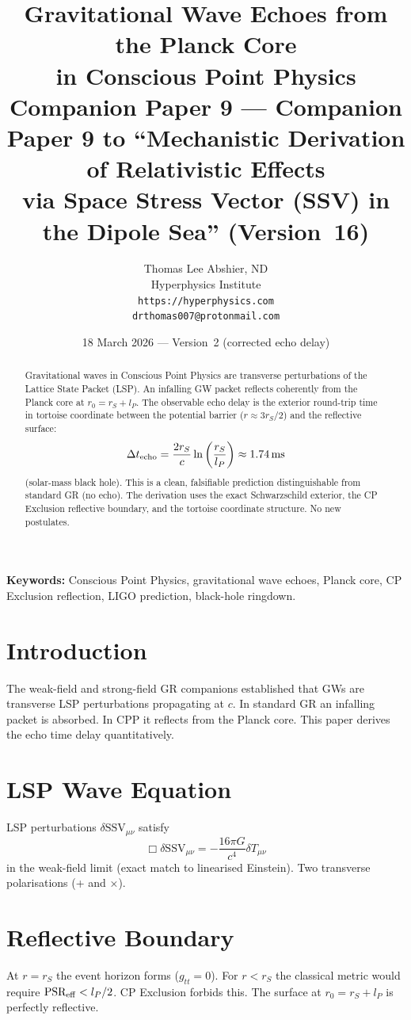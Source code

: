 \documentclass[12pt]{article}
\title{\textbf{Gravitational Wave Echoes from the Planck Core\\
in Conscious Point Physics}\\[6pt]
{\large Companion Paper 9 ---
Companion Paper 9 to ``Mechanistic Derivation of Relativistic Effects\\
via Space Stress Vector (SSV) in the Dipole Sea'' (Version~16)}}
\author{Thomas Lee Abshier, ND\\
Hyperphysics Institute\\
\texttt{https://hyperphysics.com}\\
\texttt{drthomas007@protonmail.com}}
\date{18 March 2026 --- Version~2 (corrected echo delay)}
\newcommand{\SSV}{\text{SSV}}
\begin{document}
\maketitle

\noindent\textbf{Keywords:} Conscious Point Physics, gravitational wave echoes, Planck core, CP Exclusion reflection, LIGO prediction, black-hole ringdown.

\begin{abstract}
Gravitational waves in Conscious Point Physics are transverse perturbations of the Lattice State Packet (LSP). An infalling GW packet reflects coherently from the Planck core at \(r_0 = r_S + l_P\). The observable echo delay is the exterior round-trip time in tortoise coordinate between the potential barrier (\(r \approx 3 r_S/2\)) and the reflective surface:
\[
\Delta t_{\rm echo} = \frac{2 r_S}{c} \ln\left(\frac{r_S}{l_P}\right) \approx 1.74\,\text{ms}
\]
(solar-mass black hole). This is a clean, falsifiable prediction distinguishable from standard GR (no echo). The derivation uses the exact Schwarzschild exterior, the CP Exclusion reflective boundary, and the tortoise coordinate structure. No new postulates.
\end{abstract}

\section{Introduction}
The weak-field and strong-field GR companions established that GWs are transverse LSP perturbations propagating at \(c\). In standard GR an infalling packet is absorbed. In CPP it reflects from the Planck core. This paper derives the echo time delay quantitatively.

\section{LSP Wave Equation}
LSP perturbations \(\delta\SSV_{\mu\nu}\) satisfy
\[
\Box \delta\SSV_{\mu\nu} = -\frac{16\pi G}{c^4} \delta T_{\mu\nu}
\]
in the weak-field limit (exact match to linearised Einstein). Two transverse polarisations (+ and ×).

\section{Reflective Boundary}
At \(r = r_S\) the event horizon forms (\(g_{tt} = 0\)). For \(r < r_S\) the classical metric would require \(\text{PSR}_{\rm eff} < l_P/2\). CP Exclusion forbids this. The surface at \(r_0 = r_S + l_P\) is perfectly reflective.
\end{document}
